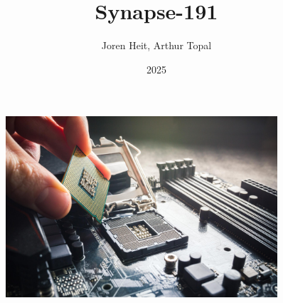 \documentclass{article}
\title{Synapse-191}
\author{Joren Heit, Arthur Topal}
\date{2025}
\begin{document}
\maketitle
\thispagestyle{empty}

\begin{figure}[H]
  \centering
  \includegraphics[width=0.9\textwidth]{img/_processor}
\end{figure}

\newpage
\tableofcontents










\end{document}
